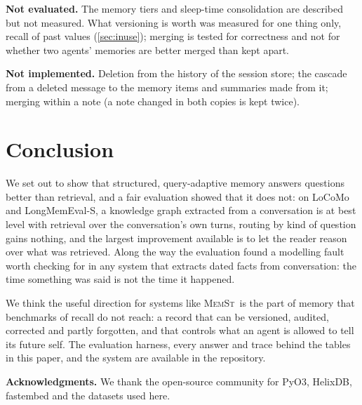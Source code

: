 \documentclass[11pt,letterpaper]{article}
\newcommand{\memst}{\textsc{MemSt}}
\begin{document}
\textbf{Not evaluated.} The memory tiers and sleep-time consolidation are described but not measured. What versioning is worth was measured for one thing only, recall of past values (\cref{sec:inuse}); merging is tested for correctness and not for whether two agents' memories are better merged than kept apart.

\textbf{Not implemented.} Deletion from the history of the session store; the cascade from a deleted message to the memory items and summaries made from it; merging within a note (a note changed in both copies is kept twice).

\section{Conclusion}
\label{sec:conclusion}

We set out to show that structured, query-adaptive memory answers questions better than retrieval, and a fair evaluation showed that it does not: on LoCoMo and LongMemEval-S, a knowledge graph extracted from a conversation is at best level with retrieval over the conversation's own turns, routing by kind of question gains nothing, and the largest improvement available is to let the reader reason over what was retrieved. Along the way the evaluation found a modelling fault worth checking for in any system that extracts dated facts from conversation: the time something was said is not the time it happened.

We think the useful direction for systems like \memst\ is the part of memory that benchmarks of recall do not reach: a record that can be versioned, audited, corrected and partly forgotten, and that controls what an agent is allowed to tell its future self. The evaluation harness, every answer and trace behind the tables in this paper, and the system are available in the repository.

\vspace{1em}
\noindent\textbf{Acknowledgments.} We thank the open-source community for PyO3, HelixDB, fastembed and the datasets used here.


\end{document}
